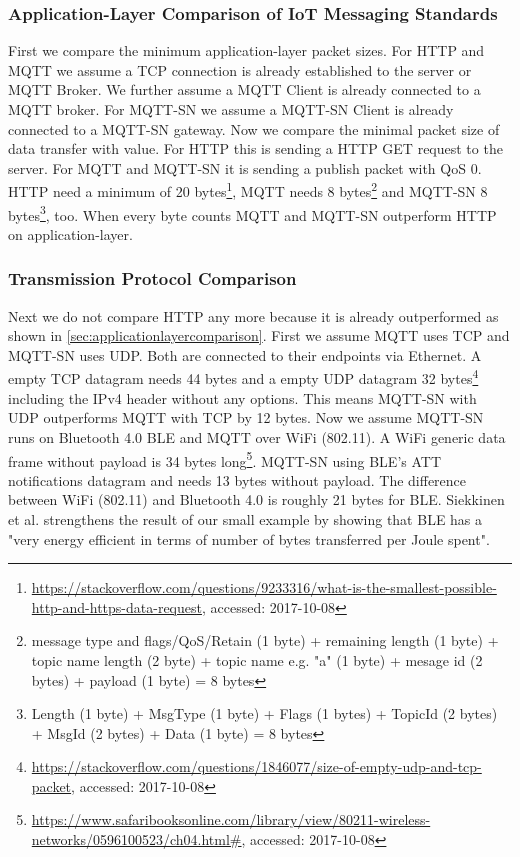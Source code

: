 \subsubsection{Application-Layer Comparison of IoT Messaging Standards}\label{sec:applicationlayercomparison}
First we compare the minimum application-layer packet sizes.
For HTTP and MQTT we assume a TCP connection is already established to the server or MQTT Broker.
We further assume a MQTT Client is already connected to a MQTT broker.
For MQTT-SN we assume a MQTT-SN Client is already connected to a MQTT-SN gateway.
Now we compare the minimal packet size of data transfer with value.
For HTTP this is sending a HTTP GET request to the server. For MQTT and MQTT-SN it is sending a publish packet with QoS 0.
HTTP need a minimum of 20 bytes\footnote{\url{https://stackoverflow.com/questions/9233316/what-is-the-smallest-possible-http-and-https-data-request}, accessed: 2017-10-08}, MQTT needs 8 bytes\footnote{message type and flags/QoS/Retain (1 byte) + remaining length (1 byte) + topic name length (2 byte) + topic name e.g. "a" (1 byte) + mesage id (2 bytes) + payload (1 byte) = 8 bytes} and MQTT-SN 8 bytes\footnote{Length (1 byte) + MsgType (1 byte) + Flags (1 bytes) + TopicId (2 bytes) + MsgId (2 bytes) + Data (1 byte) = 8 bytes}, too.
When every byte counts MQTT and MQTT-SN outperform HTTP on application-layer.
\subsubsection{Transmission Protocol Comparison}
Next we do not compare HTTP any more because it is already outperformed as shown in \autoref{sec:applicationlayercomparison}.
First we assume MQTT uses TCP and MQTT-SN uses UDP.
Both are connected to their endpoints via Ethernet.
A empty TCP datagram needs 44 bytes and a empty UDP datagram 32 bytes\footnote{\url{https://stackoverflow.com/questions/1846077/size-of-empty-udp-and-tcp-packet}, accessed: 2017-10-08} including the IPv4 header without any options.
This means MQTT-SN with UDP outperforms MQTT with TCP by 12 bytes.
Now we assume MQTT-SN runs on Bluetooth 4.0 BLE and MQTT over WiFi (802.11).
A WiFi generic data frame without payload is 34 bytes long\footnote{\url{https://www.safaribooksonline.com/library/view/80211-wireless-networks/0596100523/ch04.html\#}, accessed: 2017-10-08}.
MQTT-SN using BLE's ATT notifications datagram and needs 13 bytes without payload.
The difference between WiFi (802.11) and Bluetooth 4.0 is roughly 21 bytes for BLE\cite{howlowenergyisblelowenergy}.
Siekkinen et al. \cite{howlowenergyisblelowenergy} strengthens the result of our small example by showing that BLE has a "very energy efficient in terms of number of bytes transferred per Joule spent"\cite[p.1]{howlowenergyisblelowenergy}.

